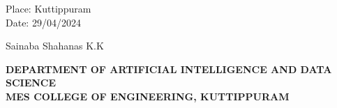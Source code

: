 \vspace{1cm}
\noindent
\begin{minipage}[t]{0.6\linewidth}
 \begin{flushleft}
  \begin{singlespace}
Place: Kuttippuram \\
Date: 29/04/2024\\
 \end{singlespace}
 \end{flushleft}
 \end{minipage}
 \hfill
 \noindent
 \begin{minipage}[t]{0.6\linewidth}
 \begin{flushleft}
  \begin{doublespace}
      
  
    \hspace{0.cm}\newline 
	\hspace{0.0cm}Sainaba Shahanas K.K \newline 
 \end{doublespace}
\end{flushleft}
\end{minipage}







 \newpage
 \thispagestyle{empty}


\begin{center}
\textbf{\fontsize{14}{12}\selectfont DEPARTMENT OF ARTIFICIAL INTELLIGENCE AND DATA SCIENCE\\
MES COLLEGE OF ENGINEERING, KUTTIPPURAM}
\end{center}

